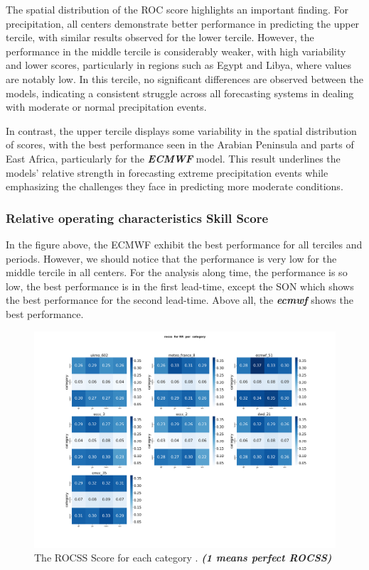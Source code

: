 The spatial distribution of the ROC score highlights an important finding. For precipitation, all centers demonstrate better performance in predicting the upper tercile, with similar results observed for the lower tercile. However, the performance in the middle tercile is considerably weaker, with high variability and lower scores, particularly in regions such as Egypt and Libya, where values are notably low. In this tercile, no significant differences are observed between the models, indicating a consistent struggle across all forecasting systems in dealing with moderate or normal precipitation events.

In contrast, the upper tercile displays some variability in the spatial distribution of scores, with the best performance seen in the Arabian Peninsula and parts of East Africa, particularly for the \textbf{\textit{ECMWF}} model. This result underlines the models' relative strength in forecasting extreme precipitation events while emphasizing the challenges they face in predicting more moderate conditions.

																
\subsubsection{Relative operating characteristics Skill Score}

In the figure above, the ECMWF exhibit the best performance for all terciles and periods. However, we should notice that the performance is very low for the middle tercile in all centers. For the analysis along time, the performance is so low, the best performance is in the first lead-time, except the SON which shows the best performance for the second lead-time. Above all, the \textbf{\textit{ecmwf}} shows the best performance.

\begin{figure}[H]
    \centering
    \includegraphics[scale=0.25]{plots/prob/rocss/rocss_RR_category.png}
    \caption{The ROCSS Score for each category  . \textbf{\textit{(1 means perfect ROCSS)}}}
\end{figure}


